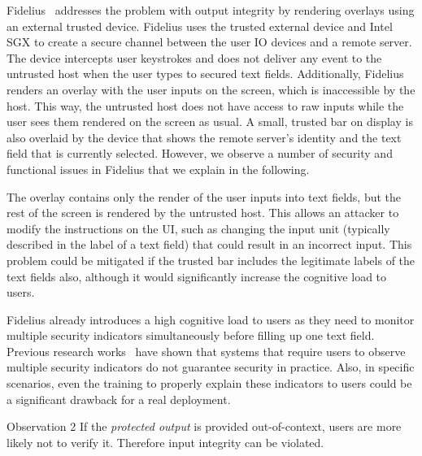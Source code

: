 Fidelius~\cite{Fidelius} addresses the problem with output integrity by rendering overlays using an external trusted device. Fidelius uses the trusted external device and Intel SGX to create a secure channel between the user IO devices and a remote server. The device intercepts user keystrokes and does not deliver any event to the untrusted host when the user types to secured text fields. Additionally, Fidelius renders an overlay with the user inputs on the screen, which is inaccessible by the host. This way, the untrusted host does not have access to raw inputs while the user sees them rendered on the screen as usual.
A small, trusted bar on display is also overlaid by the device that shows the remote server's identity and the text field that is currently selected. 
However, we observe a number of security and functional issues in Fidelius that we explain in the following. 

The overlay contains only the render of the user inputs into text fields, but the rest of the screen is rendered by the untrusted host.
This allows an attacker to modify the instructions on the UI, such as changing the input unit (typically described in the label of a text field) that could result in an incorrect input. This problem could be mitigated if the trusted bar includes the legitimate labels of the text fields also, although it would significantly increase the cognitive load to users.

Fidelius already introduces a high cognitive load to users as they need to monitor multiple security indicators simultaneously before filling up one text field. Previous research works~\cite{egelman2008you,sobey2008exploring, anderson2016warning} have shown that systems that require users to observe multiple security indicators %
do not guarantee security in practice.
Also, in specific scenarios, even the training to properly explain these indicators to users could be a significant drawback for a real deployment.


\begin{mybox}[colback=white]{Observation 2}
If the \emph{protected output} is provided out-of-context, users are more likely not to verify it. Therefore input integrity can be violated.
\end{mybox}

